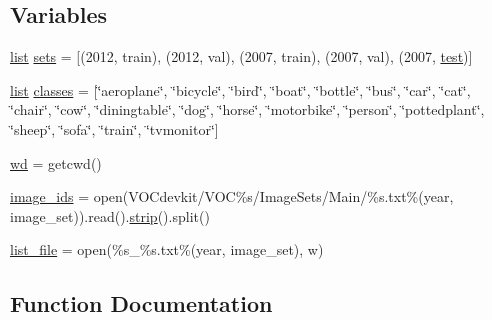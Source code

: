 \subsection*{Variables}
\begin{DoxyCompactItemize}
\item 
\mbox{\hyperlink{structlist}{list}} \mbox{\hyperlink{namespacevoc__label_a41c13500b772a8e333989ee599cb5e59}{sets}} = \mbox{[}(\textquotesingle{}2012\textquotesingle{}, \textquotesingle{}train\textquotesingle{}), (\textquotesingle{}2012\textquotesingle{}, \textquotesingle{}val\textquotesingle{}), (\textquotesingle{}2007\textquotesingle{}, \textquotesingle{}train\textquotesingle{}), (\textquotesingle{}2007\textquotesingle{}, \textquotesingle{}val\textquotesingle{}), (\textquotesingle{}2007\textquotesingle{}, \textquotesingle{}\mbox{\hyperlink{classtest}{test}}\textquotesingle{})\mbox{]}
\item 
\mbox{\hyperlink{structlist}{list}} \mbox{\hyperlink{namespacevoc__label_a0dadf92eb37e0de693533dbafa6223d7}{classes}} = \mbox{[}\char`\"{}aeroplane\char`\"{}, \char`\"{}bicycle\char`\"{}, \char`\"{}bird\char`\"{}, \char`\"{}boat\char`\"{}, \char`\"{}bottle\char`\"{}, \char`\"{}bus\char`\"{}, \char`\"{}car\char`\"{}, \char`\"{}cat\char`\"{}, \char`\"{}chair\char`\"{}, \char`\"{}cow\char`\"{}, \char`\"{}diningtable\char`\"{}, \char`\"{}dog\char`\"{}, \char`\"{}horse\char`\"{}, \char`\"{}motorbike\char`\"{}, \char`\"{}person\char`\"{}, \char`\"{}pottedplant\char`\"{}, \char`\"{}sheep\char`\"{}, \char`\"{}sofa\char`\"{}, \char`\"{}train\char`\"{}, \char`\"{}tvmonitor\char`\"{}\mbox{]}
\item 
\mbox{\hyperlink{namespacevoc__label_aae3f517979bd13e02baba600c32fa954}{wd}} = getcwd()
\item 
\mbox{\hyperlink{namespacevoc__label_a57a526ed1c226d30a484d56ca3fcda07}{image\+\_\+ids}} = open(\textquotesingle{}V\+O\+Cdevkit/V\+OC\%s/Image\+Sets/Main/\%s.\+txt\textquotesingle{}\%(year, image\+\_\+set)).read().\mbox{\hyperlink{darknet__ros_2darknet_2src_2utils_8h_a76299b86e144434260dcab80323ec9da}{strip}}().split()
\item 
\mbox{\hyperlink{namespacevoc__label_a6842cb03274520125ec688c9a076c3a6}{list\+\_\+file}} = open(\textquotesingle{}\%s\+\_\+\%s.\+txt\textquotesingle{}\%(year, image\+\_\+set), \textquotesingle{}w\textquotesingle{})
\end{DoxyCompactItemize}


\subsection{Function Documentation}
\mbox{\label{namespacevoc__label_a6acb30b6d6bbb5769eac3381abeab0aa}} 
